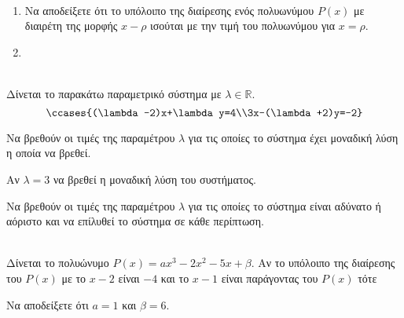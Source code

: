 \documentclass[ektypwsh]{diag-xelatex}
\begin{document}
\begin{thema}
\item \mbox{}\\
\vspace{-5mm}
\begin{enumerate}[label=\Roman*.]
\item Να αποδείξετε ότι το υπόλοιπο της διαίρεσης ενός πολυωνύμου $ P(x) $ με διαιρέτη της μορφής $ x-\rho $ ισούται με την τιμή του πολυωνύμου για $ x=\rho $.
\item \swstolathos
{}
\end{enumerate}
\item \mbox{}\\
Δίνεται το παρακάτω παραμετρικό σύστημα με $ \lambda\in\mathbb{R} $.
\[ \ccases{(\lambda-2)x+\lambda y=4\\3x-(\lambda+2)y=-2} \]
\begin{rlist}
\item Να βρεθούν οι τιμές της παραμέτρου $ \lambda $ για τις οποίες το σύστημα έχει μοναδική λύση η οποία να βρεθεί.
\item Αν $ \lambda=3 $ να βρεθεί η μοναδική λύση του συστήματος.
\item Να βρεθούν οι τιμές της παραμέτρου $ \lambda $ για τις οποίες το σύστημα είναι αδύνατο ή αόριστο και να επίλυθεί το σύστημα σε κάθε περίπτωση.
\end{rlist}
\item \mbox{}\\
Δίνεται το πολυώνυμο $ P(x)=ax^3-2x^2-5x+\beta $. Αν το υπόλοιπο της διαίρεσης του $ P(x) $ με το $ x-2 $ είναι $ -4 $ και το $ x-1 $ είναι παράγοντας του $ P(x) $ τότε
\begin{rlist}
\item Να αποδείξετε ότι $ a=1 $ και $ \beta=6 $.

\end{rlist}
\end{thema}
\end{document}
